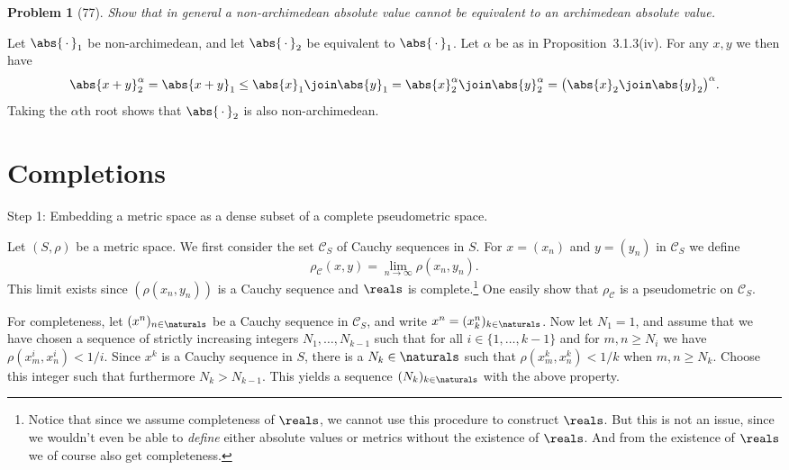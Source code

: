 \documentclass[a4paper, 11pt]{memoir}
\theoremstyle{plaincustomnumber}
\newtheorem{problem}{Problem}
\theoremstyle{changedotbreakcustomnumber}
\newcommand{\calC}{\mathcal{C}}
\begin{document}
\begin{problem}[77]
    Show that in general a non-archimedean absolute value cannot be equivalent to an archimedean absolute value.
\end{problem}

\begin{solution}
    Let $\abs{\,\cdot\,}_1$ be non-archimedean, and let $\abs{\,\cdot\,}_2$ be equivalent to $\abs{\,\cdot\,}_1$. Let $\alpha$ be as in Proposition~3.1.3(iv). For any $x,y$ we then have
    \begin{equation*}
        \abs{x+y}_2^\alpha
            = \abs{x+y}_1
            \leq \abs{x}_1 \join \abs{y}_1
            = \abs{x}_2^\alpha \join \abs{y}_2^\alpha
            = \bigl( \abs{x}_2 \join \abs{y}_2 \bigr)^\alpha.
    \end{equation*}
    Taking the $\alpha$th root shows that $\abs{\,\cdot\,}_2$ is also non-archimedean.
\end{solution}


\section{Completions}

Step 1: Embedding a metric space as a dense subset of a complete pseudometric space.

Let $(S,\rho)$ be a metric space. We first consider the set $\calC_S$ of Cauchy sequences in $S$. For $x = (x_n)$ and $y = (y_n)$ in $\calC_S$ we define
%
\begin{equation*}
    \rho_\calC(x,y)
        = \lim_{n \to \infty} \rho(x_n,y_n).
\end{equation*}
%
This limit exists since $(\rho(x_n,y_n))$ is a Cauchy sequence and $\reals$ is complete.\footnote{Notice that since we assume completeness of $\reals$, we cannot use this procedure to construct $\reals$. But this is not an issue, since we wouldn't even be able to \emph{define} either absolute values or metrics without the existence of $\reals$. And from the existence of $\reals$ we of course also get completeness.} One easily show that $\rho_\calC$ is a pseudometric on $\calC_S$.

For completeness, let $(x^n)_{n \in \naturals}$ be a Cauchy sequence in $\calC_S$, and write $x^n = (x^n_k)_{k \in \naturals}$. Now let $N_1 = 1$, and assume that we have chosen a sequence of strictly increasing integers $N_1, \ldots, N_{k-1}$ such that for all $i \in \{1,\ldots,k-1\}$ and for $m,n \geq N_i$ we have $\rho(x^i_m,x^i_n) < 1/i$. Since $x^k$ is a Cauchy sequence in $S$, there is a $N_k \in \naturals$ such that $\rho(x^k_m,x^k_n) < 1/k$ when $m,n \geq N_k$. Choose this integer such that furthermore $N_k > N_{k-1}$. This yields a sequence $(N_k)_{k \in \naturals}$ with the above property.
\end{document}
